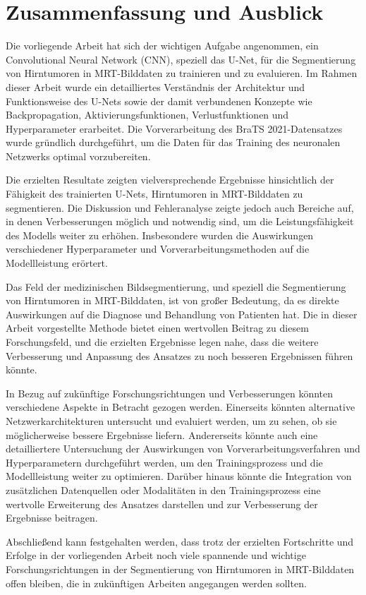 \chapter{Zusammenfassung und Ausblick}
Die vorliegende Arbeit hat sich der wichtigen Aufgabe angenommen, ein Convolutional Neural Network (CNN), speziell das U-Net, für die Segmentierung von Hirntumoren in MRT-Bilddaten zu trainieren und zu evaluieren. Im Rahmen dieser Arbeit wurde ein detailliertes Verständnis der Architektur und Funktionsweise des U-Nets sowie der damit verbundenen Konzepte wie Backpropagation, Aktivierungsfunktionen, Verlustfunktionen und Hyperparameter erarbeitet. Die Vorverarbeitung des BraTS 2021-Datensatzes wurde gründlich durchgeführt, um die Daten für das Training des neuronalen Netzwerks optimal vorzubereiten.

Die erzielten Resultate zeigten vielversprechende Ergebnisse hinsichtlich der Fähigkeit des trainierten U-Nets, Hirntumoren in MRT-Bilddaten zu segmentieren. Die Diskussion und Fehleranalyse zeigte jedoch auch Bereiche auf, in denen Verbesserungen möglich und notwendig sind, um die Leistungsfähigkeit des Modells weiter zu erhöhen. Insbesondere wurden die Auswirkungen verschiedener Hyperparameter und Vorverarbeitungsmethoden auf die Modellleistung erörtert.

Das Feld der medizinischen Bildsegmentierung, und speziell die Segmentierung von Hirntumoren in MRT-Bilddaten, ist von großer Bedeutung, da es direkte Auswirkungen auf die Diagnose und Behandlung von Patienten hat. Die in dieser Arbeit vorgestellte Methode bietet einen wertvollen Beitrag zu diesem Forschungsfeld, und die erzielten Ergebnisse legen nahe, dass die weitere Verbesserung und Anpassung des Ansatzes zu noch besseren Ergebnissen führen könnte.

In Bezug auf zukünftige Forschungsrichtungen und Verbesserungen könnten verschiedene Aspekte in Betracht gezogen werden. Einerseits könnten alternative Netzwerkarchitekturen untersucht und evaluiert werden, um zu sehen, ob sie möglicherweise bessere Ergebnisse liefern. Andererseits könnte auch eine detailliertere Untersuchung der Auswirkungen von Vorverarbeitungsverfahren und Hyperparametern durchgeführt werden, um den Trainingsprozess und die Modellleistung weiter zu optimieren. Darüber hinaus könnte die Integration von zusätzlichen Datenquellen oder Modalitäten in den Trainingsprozess eine wertvolle Erweiterung des Ansatzes darstellen und zur Verbesserung der Ergebnisse beitragen.

Abschließend kann festgehalten werden, dass trotz der erzielten Fortschritte und Erfolge in der vorliegenden Arbeit noch viele spannende und wichtige Forschungsrichtungen in der Segmentierung von Hirntumoren in MRT-Bilddaten offen bleiben, die in zukünftigen Arbeiten angegangen werden sollten.